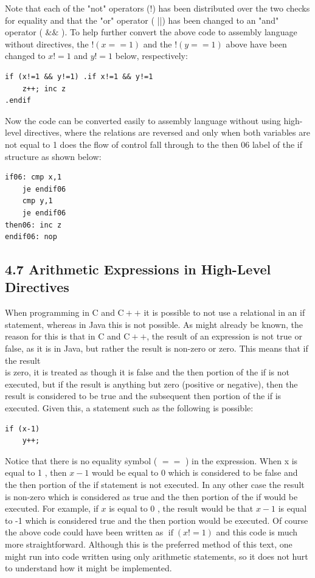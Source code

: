 \documentclass[10pt]{article}
\begin{document}
Note that each of the "not" operators (!) has been distributed over the two checks for equality and that the "or" operator ( ||) has been changed to an "and" operator ( $\& \&$ ). To help further convert the above code to assembly language without directives, the $!(x==1)$ and the $!(y==1)$ above have been changed to $x!=1$ and $y!=1$ below, respectively:

\begin{verbatim}
if (x!=1 && y!=1) .if x!=1 && y!=1
    z++; inc z
.endif
\end{verbatim}

Now the code can be converted easily to assembly language without using high-level directives, where the relations are reversed and only when both variables are not equal to 1 does the flow of control fall through to the then 06 label of the if structure as shown below:

\begin{verbatim}
if06: cmp x,1
    je endif06
    cmp y,1
    je endif06
then06: inc z
endif06: nop
\end{verbatim}

\subsection*{4.7 Arithmetic Expressions in High-Level Directives}
When programming in C and $\mathrm{C}++$ it is possible to not use a relational in an if statement, whereas in Java this is not possible. As might already be known, the reason for this is that in C and $\mathrm{C}++$, the result of an expression is not true or false, as it is in Java, but rather the result is non-zero or zero. This means that if the result\\
is zero, it is treated as though it is false and the then portion of the if is not executed, but if the result is anything but zero (positive or negative), then the result is considered to be true and the subsequent then portion of the if is executed. Given this, a statement such as the following is possible:

\begin{verbatim}
if (x-1)
    y++;
\end{verbatim}

Notice that there is no equality symbol ( $==$ ) in the expression. When x is equal to 1 , then $x-1$ would be equal to 0 which is considered to be false and the then portion of the if statement is not executed. In any other case the result is non-zero which is considered as true and the then portion of the if would be executed. For example, if $x$ is equal to 0 , the result would be that $x-1$ is equal to -1 which is considered true and the then portion would be executed. Of course the above code could have been written as $\operatorname{if}(x!=1)$ and this code is much more straightforward. Although this is the preferred method of this text, one might run into code written using only arithmetic statements, so it does not hurt to understand how it might be implemented.
\end{document}

